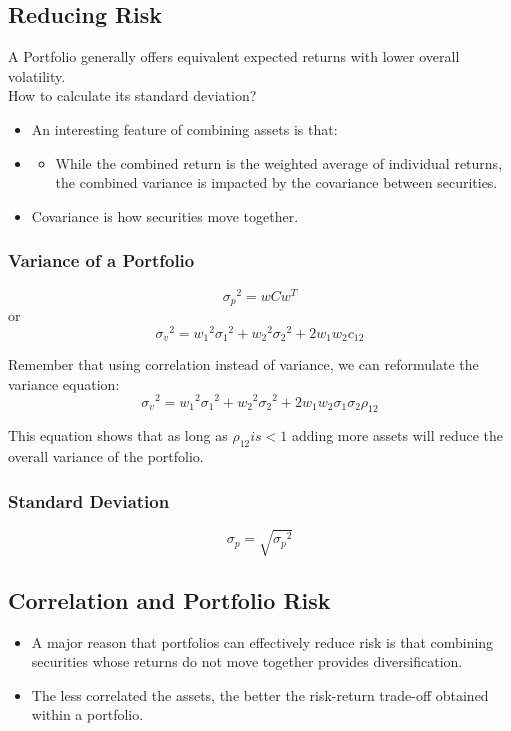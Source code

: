 \documentclass[11pt,a4paper]{report}
\begin{document}
\subsection{Reducing Risk}
A Portfolio generally offers equivalent expected returns with lower overall volatility.
\\How to calculate its standard deviation?
\begin{itemize}
    \item An interesting feature of combining assets is that:
    \item \begin{itemize}
        \item While the combined return is the weighted average of individual returns, the combined variance is impacted by the covariance between securities.
    \end{itemize}
    \item{Covariance is how securities move together.}
\end{itemize}
\subsubsection{Variance of a Portfolio}
\[\sigma_p{^2} = wCw^T\]
or
\[\sigma_v{^2} = w_1{^2}\sigma_1{^2} + w_2{^2}\sigma_2{^2} + 2w_1w_2c_{12}\]

Remember that using correlation instead of variance, we can reformulate the variance equation:
\[\sigma_v{^2} = w_1{^2}\sigma_1{^2} + w_2{^2}\sigma_2{^2} + 2w_1w_2\sigma_1\sigma_2\rho_{12}\]

This equation shows that as long as $\rho_{12} is < 1$ adding more assets will reduce the overall variance of the portfolio.

\subsubsection{Standard Deviation}
\[\sigma_p = \sqrt{\sigma_p{^2}}\]

\subsection{Correlation and Portfolio Risk}
\begin{itemize}
    \item A major reason that portfolios can effectively reduce risk is that combining securities whose returns do not move together provides diversification.
    \item The less correlated the assets, the better the risk-return trade-off obtained within a portfolio.
\end{itemize}
\end{document}
